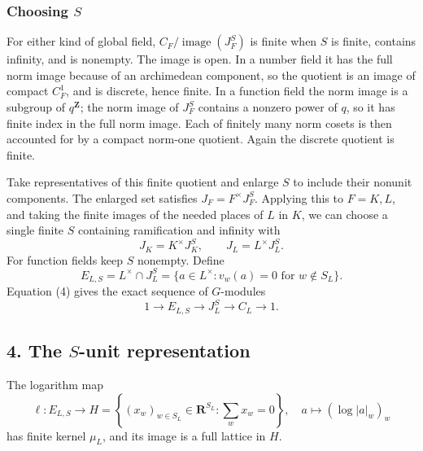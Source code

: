 \documentclass[11pt,a4paper]{article}
\begin{document}
\subsubsection{\texorpdfstring{Choosing
\(S\)}{Choosing S}}\label{choosing-s}

For either kind of global field, \(C_F/\operatorname{image}(J_F^S)\) is
finite when \(S\) is finite, contains infinity, and is nonempty. The
image is open. In a number field it has the full norm image because of
an archimedean component, so the quotient is an image of compact
\(C_F^1\), and is discrete, hence finite. In a function field the norm
image is a subgroup of \(q^{\mathbf Z}\); the norm image of \(J_F^S\)
contains a nonzero power of \(q\), so it has finite index in the full
norm image. Each of finitely many norm cosets is then accounted for by a
compact norm-one quotient. Again the discrete quotient is finite.

Take representatives of this finite quotient and enlarge \(S\) to
include their nonunit components. The enlarged set satisfies
\(J_F=F^\times J_F^S\). Applying this to \(F=K,L\), and taking the
finite images of the needed places of \(L\) in \(K\), we can choose a
single finite \(S\) containing ramification and infinity with \[
J_K=K^\times J_K^S,\qquad J_L=L^\times J_L^S.
\tag{4}
\] For function fields keep \(S\) nonempty. Define \[
E_{L,S}=L^\times\cap J_L^S
=\{a\in L^\times:v_w(a)=0\text{ for }w\notin S_L\}.
\] Equation (4) gives the exact sequence of \(G\)-modules \[
1\longrightarrow E_{L,S}\longrightarrow J_L^S
\longrightarrow C_L\longrightarrow1.
\tag{5}
\]

\subsection{\texorpdfstring{4. The \(S\)-unit
representation}{4. The S-unit representation}}\label{the-s-unit-representation}

The logarithm map \[
\ell:E_{L,S}\longrightarrow
H=\left\{(x_w)_{w\in S_L}\in\mathbf R^{S_L}:
                         \sum_w x_w=0\right\},
\quad a\longmapsto(\log|a|_w)_w
\tag{6}
\] has finite kernel \(\mu_L\), and its image is a full lattice in
\(H\).
\end{document}
